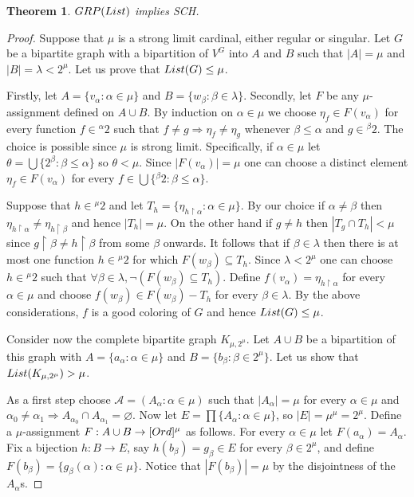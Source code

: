 \documentclass[11pt]{amsart}
\newtheorem{theorem}{Theorem}
\theoremstyle{definition}
\theoremstyle{remark}
\begin{document}
\begin{theorem}
\label{thmgrplist} ${\rm GRP}({\rm List})$ implies SCH.
\end{theorem}

\begin{proof}
Suppose that $\mu$ is a strong limit cardinal, either regular or singular.
Let $G$ be a bipartite graph with a bipartition of $V^G$ into $A$ and $B$ such that $|A|=\mu$ and $|B|=\lambda<2^\mu$.
Let us prove that ${\rm List}(G)\leq\mu$.

Firstly, let $A=\{v_\alpha:\alpha\in\mu\}$ and $B=\{w_\beta:\beta\in\lambda\}$.
Secondly, let $F$ be any $\mu$-assignment defined on $A\cup B$.
By induction on $\alpha\in\mu$ we choose $\eta_f\in F(v_\alpha)$ for every function $f\in{}^\alpha 2$ such that $f\neq g\Rightarrow\eta_f\neq\eta_g$ whenever $\beta\leq\alpha$ and $g\in{}^\beta 2$.
The choice is possible since $\mu$ is strong limit.
Specifically, if $\alpha\in\mu$ let $\theta=\bigcup\{2^\beta:\beta\leq\alpha\}$ so $\theta<\mu$.
Since $|F(v_\alpha)|=\mu$ one can choose a distinct element $\eta_f\in F(v_\alpha)$ for every $f\in\bigcup\{{}^\beta 2:\beta\leq\alpha\}$.

Suppose that $h\in{}^\mu 2$ and let $T_h=\{\eta_{h\upharpoonright\alpha}:\alpha\in\mu\}$.
By our choice if $\alpha\neq\beta$ then $\eta_{h\upharpoonright\alpha}\neq\eta_{h\upharpoonright\beta}$ and hence $|T_h|=\mu$.
On the other hand if $g\neq h$ then $|T_g\cap T_h|<\mu$ since $g\upharpoonright\beta\neq h\upharpoonright\beta$ from some $\beta$ onwards.
It follows that if $\beta\in\lambda$ then there is at most one function $h\in{}^\mu 2$ for which $F(w_\beta)\subseteq T_h$.
Since $\lambda<2^\mu$ one can choose $h\in{}^\mu 2$ such that $\forall\beta\in\lambda,\neg(F(w_\beta)\subseteq T_h)$.
Define $f(v_\alpha)=\eta_{h\upharpoonright\alpha}$ for every $\alpha\in\mu$ and choose $f(w_\beta)\in F(w_\beta)-T_h$ for every $\beta\in\lambda$.
By the above considerations, $f$ is a good coloring of $G$ and hence ${\rm List}(G)\leq\mu$.

Consider now the complete bipartite graph $K_{\mu,2^\mu}$.
Let $A\cup B$ be a bipartition of this graph with $A=\{a_\alpha:\alpha\in\mu\}$ and $B=\{b_\beta:\beta\in 2^\mu\}$.
Let us show that ${\rm List}(K_{\mu,2^\mu})>\mu$.

As a first step choose $\mathcal{A}=(A_\alpha:\alpha\in\mu)$ such that $|A_\alpha|=\mu$ for every $\alpha\in\mu$ and $\alpha_0\neq\alpha_1\Rightarrow A_{\alpha_0}\cap A_{\alpha_1}=\varnothing$.
Now let $E=\prod\{A_\alpha:\alpha\in\mu\}$, so $|E|=\mu^\mu=2^\mu$.
Define a $\mu$-assignment $F:A\cup B\rightarrow[{\rm Ord}]^\mu$ as follows.
For every $\alpha\in\mu$ let $F(a_\alpha)=A_\alpha$.
Fix a bijection $h:B\rightarrow E$, say $h(b_\beta)=g_\beta\in E$ for every $\beta\in 2^\mu$, and define $F(b_\beta)=\{g_\beta(\alpha):\alpha\in\mu\}$.
Notice that $|F(b_\beta)|=\mu$ by the disjointness of the $A_\alpha$s.


\end{proof}
\end{document}

